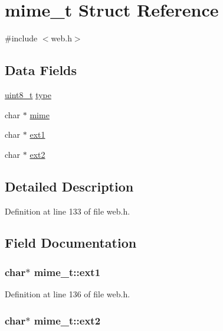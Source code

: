 \hypertarget{structmime__t}{\section{mime\-\_\-t Struct Reference}
\label{structmime__t}
}


{\ttfamily \#include $<$web.\-h$>$}

\subsection*{Data Fields}
\begin{DoxyCompactItemize}
\item 
\hyperlink{send_8c_aba7bc1797add20fe3efdf37ced1182c5}{uint8\-\_\-t} \hyperlink{structmime__t_ae69826dcfd475d65fa0fe8a1574bb3af}{type}
\item 
char $\ast$ \hyperlink{structmime__t_ad796d16eaee60d7435bff66b2e9b8a8d}{mime}
\item 
char $\ast$ \hyperlink{structmime__t_a22af12abb536a48d3425a3a4d1cce2a4}{ext1}
\item 
char $\ast$ \hyperlink{structmime__t_ae16e9342ecd4df97a2564658f1f506b1}{ext2}
\end{DoxyCompactItemize}


\subsection{Detailed Description}


Definition at line 133 of file web.\-h.



\subsection{Field Documentation}
\hypertarget{structmime__t_a22af12abb536a48d3425a3a4d1cce2a4}{
\subsubsection[{ext1}]{\setlength{\rightskip}{0pt plus 5cm}char$\ast$ mime\-\_\-t\-::ext1}}\label{structmime__t_a22af12abb536a48d3425a3a4d1cce2a4}


Definition at line 136 of file web.\-h.

\hypertarget{structmime__t_ae16e9342ecd4df97a2564658f1f506b1}{
\subsubsection[{ext2}]{\setlength{\rightskip}{0pt plus 5cm}char$\ast$ mime\-\_\-t\-::ext2}}\label{structmime__t_ae16e9342ecd4df97a2564658f1f506b1}



